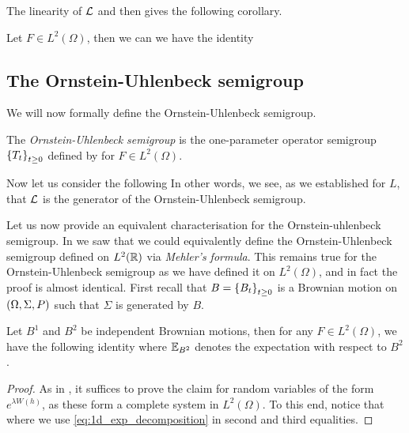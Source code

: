 \documentclass[../main.tex]{subfiles}
\begin{document}
The linearity of $\mathcal{L}$ and  then gives the following corollary.
\begin{corollary}
\label{cor:OU_on_L2}
Let $F\in L^2(\Omega)$, then we can we have the identity 
\end{corollary} 

\subsection{The Ornstein-Uhlenbeck semigroup}
We will now formally define the Ornstein-Uhlenbeck semigroup.
\begin{definition}
\label{def:OU_semigroup}
The \emph{Ornstein-Uhlenbeck semigroup} is the one-parameter operator semigroup $\cbr{T_t}_{t\geq0}$ defined by  for $F\in L^2(\Omega)$.
\end{definition}

Now let us consider the following  In other words, we see, as we established for $L$, that $\mathcal{L}$ is the generator of the Ornstein-Uhlenbeck semigroup.

Let us now provide an equivalent characterisation for the Ornstein-uhlenbeck semigroup. In  we saw that we could equivalently define the Ornstein-Uhlenbeck semigroup defined on $L^2(\operatorname{\mathbb{R}})$ via \emph{Mehler's formula}. This remains true for the Ornstein-Uhlenbeck semigroup as we have defined it on $L^2(\Omega)$, and in fact the proof is almost identical. First recall that $B = \cbr{B_t}_{t\geq0}$ is a Brownian motion on $\del{\Omega,\Sigma,P}$ such that $\Sigma$ is generated by $B$.
\begin{proposition}
\label{prop:arb_Mehler}
Let $B^1$ and $B^2$ be independent Brownian motions, then for any $F\in L^2(\Omega)$, we have the following identity  where $\mathbb{E}_{B^2}$ denotes the expectation with respect to $B^2$.
\end{proposition}
\begin{proof}
As in , it suffices to prove the claim for random variables of the form $e^{\lambda W(h)}$, as these form a complete system in $L^2(\Omega)$. To this end, notice that  where we use \eqref{eq:1d_exp_decomposition} in second and third equalities.
\end{proof}
\end{document}
